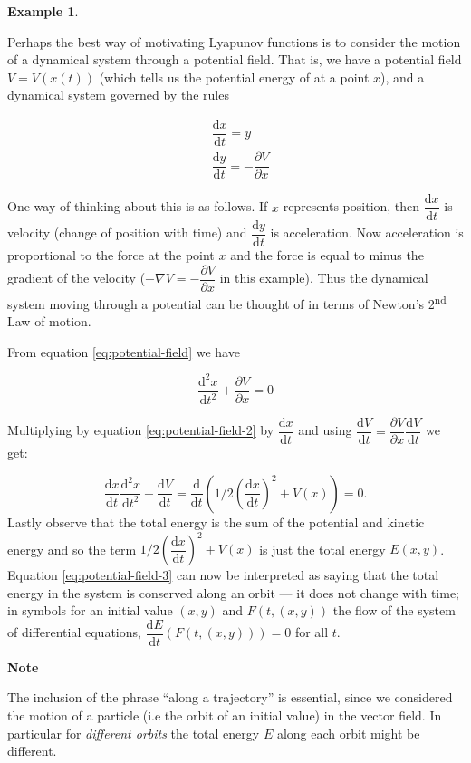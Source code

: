 \documentclass[
  a4paper,
  oneside,
  final]{krantz}
\renewcommand{\d}{\mathrm{d}}
\newcommand{\pder}[2]{\dfrac{\partial #1}{\partial#2}}
\newcommand{\der}[2]{\dfrac{\d #1}{\d #2}}
\newcommand{\dern}[3]{\dfrac{\d^{#3} #1}{\d #2 ^{#3}}}
\theoremstyle{definition}
\theoremstyle{definition}
\newtheorem{example}{Example}[chapter]
\theoremstyle{definition}
\theoremstyle{definition}
\theoremstyle{remark}
\begin{document}
\begin{example}
\protect\hypertarget{exm:lyapunov-motivation}{}\label{exm:lyapunov-motivation}

Perhaps the best way of motivating Lyapunov functions is to consider the motion of a dynamical system through a potential field. That is, we have a potential field \(V = V(x(t))\) (which tells us the potential energy of at a point \(x\)), and a dynamical system governed by the rules

\begin{align}
    &\der{x}{t} =  y \\
    &\der{y}{t} = - \pder{V}{x}
    \label{eq:potential-field}
\end{align}

One way of thinking about this is as follows. If \(x\) represents position, then \(\der{x}{t}\) is velocity (change of position with time) and \(\der{y}{t}\) is acceleration. Now acceleration is proportional to the force at the point \(x\) and the force is equal to minus the gradient of the velocity (\(-\nabla{V} = -\pder{V}{x}\) in this example). Thus the dynamical system moving through a potential can be thought of in terms of Newton's 2\textsuperscript{nd} Law of motion.

From equation \eqref{eq:potential-field} we have

\begin{equation}
 \dern{x}{t}{2} + \pder{V}{x} = 0
 \label{eq:potential-field-2}
\end{equation}

Multiplying by equation \eqref{eq:potential-field-2} by \(\der{x}{t}\) and using \(\der{V}{t} = \pder{V}{x} \der{V}{t}\) we get:

\begin{equation}
 \der{x}{t}\dern{x}{t}{2} + \der{V}{t} = \der{}{t}\left(1/2 \left(\der{x}{t}\right)^2 + V(x)\right) = 0.
\label{eq:potential-field-3}
\end{equation}
Lastly observe that the total energy is the sum of the potential and kinetic energy and so the term \(1/2 \left(\der{x}{t}\right)^2 + V(x)\) is just the total energy \(E(x,y)\). Equation \eqref{eq:potential-field-3} can now be interpreted as saying that the total energy in the system is conserved along an orbit --- it does not change with time; in symbols for an initial value \((x,y)\) and \(F(t, (x,y))\) the flow of the system of differential equations, \(\der{E}{t}(F(t, (x,y))) = 0\) for all \(t\).

\begin{palegreenbox}

\begin{center}
\textbf{Note}

\end{center}

The inclusion of the phrase ``along a trajectory'' is essential, since we considered the motion of a particle (i.e the orbit of an initial value) in the vector field. In particular for \emph{different orbits} the total energy \(E\) along each orbit might be different.

\end{palegreenbox}

\end{example}
\end{document}
